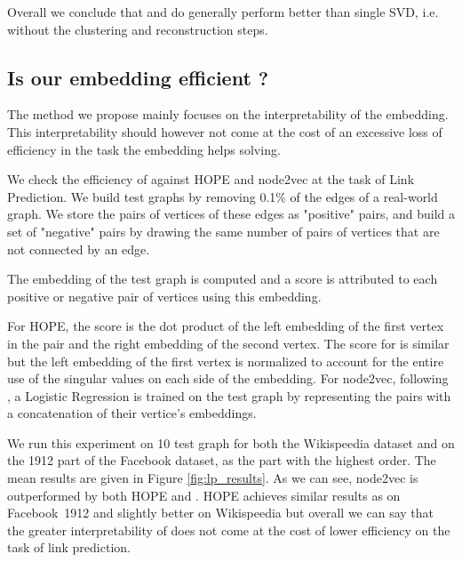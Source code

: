 Overall we conclude that \newembLeft{} and \newembRight{} do generally perform better than single SVD, i.e. without the clustering and reconstruction steps.

\subsection{Is our embedding efficient ?}
The method we propose mainly focuses on the interpretability of the embedding. This interpretability should however not come at the cost of an excessive loss of efficiency in the task the embedding helps solving.

We check the efficiency of \parfaite{} against HOPE and node2vec at the task of Link Prediction. We build test graphs by removing 0.1\% of the edges of a real-world graph. We store the pairs of vertices of these edges as "positive" pairs, and build a set of "negative" pairs by drawing the same number of pairs of vertices that are not connected by an edge.

The embedding of the test graph is computed and a score is attributed to each positive or negative pair of vertices using this embedding.

For HOPE, the score is the dot product of the left embedding of the first vertex in the pair and the right embedding of the second vertex. The score for \parfaite{} is similar but the left embedding of the first vertex is normalized to account for the entire use of the singular values on each side of the embedding. For node2vec, following \cite{groverNode2vecScalableFeature2016}, a Logistic Regression is trained on the test graph by representing the pairs with a concatenation of their vertice's embeddings.

We run this experiment on 10 test graph for both the Wikispeedia dataset and on the 1912 part of the Facebook dataset, as the part with the highest order. The mean results are given in Figure \ref{fig:lp_results}. As we can see, node2vec is outperformed by both HOPE and \parfaite{}. HOPE achieves similar results as \parfaite{} on Facebook~1912 and slightly better on Wikispeedia but overall we can say that the greater interpretability of \parfaite{} does not come at the cost of lower efficiency on the task of link prediction.

